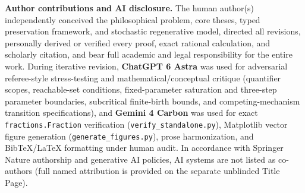 \documentclass[11pt,a4paper]{article}
\begin{document}
\textbf{Author contributions and AI disclosure.} The human author(s)
independently conceived the philosophical problem, core theses, typed
preservation framework, and stochastic regenerative model, directed all
revisions, personally derived or verified every proof, exact rational
calculation, and scholarly citation, and bear full academic and legal
responsibility for the entire work. During iterative revision,
\textbf{ChatGPT 6 Astra} was used for adversarial referee-style
stress-testing and mathematical/conceptual critique (quantifier scopes,
reachable-set conditions, fixed-parameter saturation and three-step
parameter boundaries, subcritical finite-birth bounds, and
competing-mechanism transition specifications), and \textbf{Gemini 4
Carbon} was used for exact \texttt{fractions.Fraction} verification
(\texttt{verify\_standalone.py}), Matplotlib vector figure generation
(\texttt{generate\_figures.py}), prose harmonization, and BibTeX/LaTeX
formatting under human audit. In accordance with Springer Nature
authorship and generative AI policies, AI systems are not listed as
co-authors (full named attribution is provided on the separate unblinded
Title Page).

\clearpage
\begingroup
\nolinenumbers
{}
\small
\setlength{\bibsep}{5pt}


\endgroup
\end{document}
